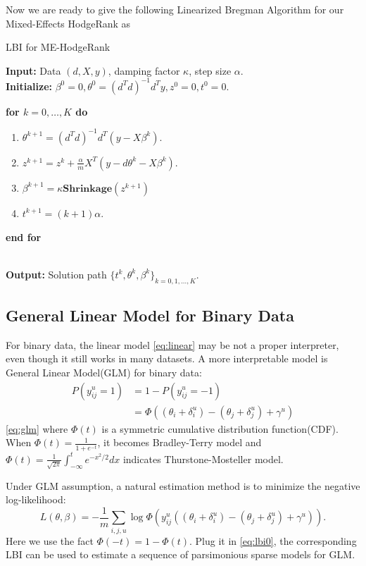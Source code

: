 \documentclass[10pt,journal,cspaper,compsoc]{IEEEtran}
\begin{document}
{Now we are ready to give the following Linearized Bregman Algorithm for our Mixed-Effects HodgeRank as
\begin{algorithm}
\caption{LBI for ME-HodgeRank}\label{alg-LBI-LME}
\textbf{Input:} Data $(d,X,y)$, damping factor $\kappa$, step size $\alpha$.\\
\textbf{Initialize:} $\beta^0 = 0,\theta^0 = (d^Td)^{-1}d^Ty,z^0=0,t^0=0$.\\
{\textbf{for $k=0,\dots,K$ do}
\begin{enumerate}
\item $\theta^{k+1} = (d^Td)^{-1}d^T(y - X\beta^k)$. \label{alg2-step1}
\item $z^{k+1}  =z^{k} + \frac{\alpha}{m} X^T(y - d\theta^k - X\beta^k)$.\label{alg2-step2}
\item $\beta^{k+1} = \kappa\mathbf{Shrinkage}(z^{k+1})$
\item $t^{k+1} = (k+1)\alpha$.
\end{enumerate}
\textbf{end for}}\\
\textbf{Output:} Solution path $\{t^k, \theta^k,\beta^k\}_{k= 0,1,\dots,K}$.
\end{algorithm}

\subsection{General Linear Model for Binary Data} \label{sec:glm}
For binary data, the linear model \eqref{eq:linear} may be not a proper interpreter, even though it still works in many datasets. A more interpretable model is General Linear Model(GLM) for binary data:
\begin{align}\label{eq:glm}
P(y^u_{ij} = 1) &= 1-P(y^u_{ij}=-1) \nonumber\\
&= \Phi((\theta_i+\delta_i^u) - (\theta_j+\delta_j^u) + \gamma^u)
\end{align}
\eqref{eq:glm} where $\Phi(t)$ is a symmetric cumulative distribution function(CDF). When $\Phi(t) = \frac{1}{1+e^{-t}}$, it becomes Bradley-Terry model and $\Phi(t) = \frac{1}{\sqrt{2\pi}}\int_{-\infty}^{t}e^{-x^2/2}dx$ indicates Thurstone-Mosteller model.

Under GLM assumption, a natural estimation method is to minimize the negative log-likelihood:
\begin{equation}\label{eq:likelihood}
L(\theta,\beta) = -\frac{1}{m}\sum_{i,j,u}\log\Phi(y^u_{ij}((\theta_i+\delta_i^u) - (\theta_j+\delta_j^u) + \gamma^u)).
\end{equation}
Here we use the fact $\Phi(-t) = 1-\Phi(t)$. Plug it in \eqref{eq:lbi0}, the corresponding LBI can be used to estimate a sequence of parsimonious sparse models for GLM.

}
\end{document}
